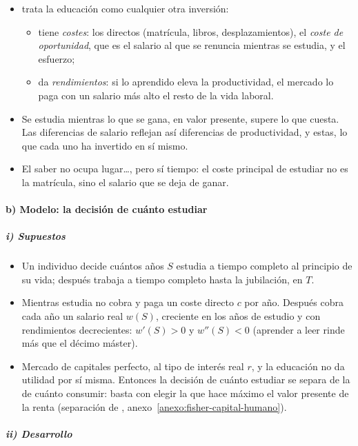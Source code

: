 \documentclass[11pt]{article}
\begin{document}
\begin{itemize}
\item \textcite{Becker1964Human} trata la educación como cualquier otra inversión:
  \begin{itemize}
  \item tiene \emph{costes}: los directos (matrícula, libros, desplazamientos), el \emph{coste de oportunidad}, que es el salario al que se renuncia mientras se estudia, y el esfuerzo;
  \item da \emph{rendimientos}: si lo aprendido eleva la productividad, el mercado lo paga con un salario más alto el resto de la vida laboral.
  \end{itemize}
\item Se estudia mientras lo que se gana, en valor presente, supere lo que cuesta. Las diferencias de salario reflejan así diferencias de productividad, y estas, lo que cada uno ha invertido en sí mismo.
\item El saber no ocupa lugar\ldots, pero sí tiempo: el coste principal de estudiar no es la matrícula, sino el salario que se deja de ganar.
\end{itemize}

\paragraph{b) Modelo: la decisión de cuánto estudiar}\label{sec:becker-modelo}

\subparagraph{i) Supuestos}

\begin{itemize}
\item Un individuo decide cuántos años $S$ estudia a tiempo completo al principio de su vida; después trabaja a tiempo completo hasta la jubilación, en $T$.
\item Mientras estudia no cobra y paga un coste directo $c$ por año. Después cobra cada año un salario real $w(S)$, creciente en los años de estudio y con rendimientos decrecientes: $w'(S)>0$ y $w''(S)<0$ (aprender a leer rinde más que el décimo máster).
\item Mercado de capitales perfecto, al tipo de interés real $r$, y la educación no da utilidad por sí misma. Entonces la decisión de cuánto estudiar se separa de la de cuánto consumir: basta con elegir la que hace máximo el valor presente de la renta (separación de , anexo~\ref{anexo:fisher-capital-humano}).
\end{itemize}

\subparagraph{ii) Desarrollo}
\end{document}
